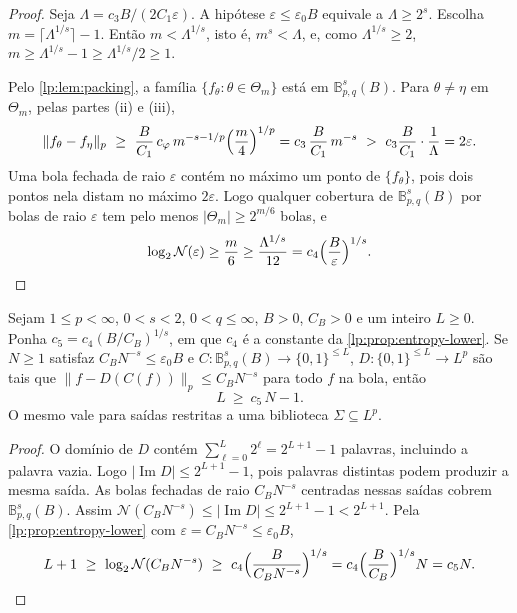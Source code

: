 \documentclass[12pt,a4paper]{article}
\begin{document}
\begin{proof}
Seja $\Lambda=c_3B/(2C_1\varepsilon)$. A hipótese $\varepsilon\le\varepsilon_0B$ equivale a $\Lambda\ge2^s$. Escolha $m=\lceil\Lambda^{1/s}\rceil-1$. Então $m<\Lambda^{1/s}$, isto é, $m^s<\Lambda$, e, como $\Lambda^{1/s}\ge2$, $m\ge\Lambda^{1/s}-1\ge\Lambda^{1/s}/2\ge1$.

Pelo \cref{lp:lem:packing}, a família $\{f_\theta:\theta\in\Theta_m\}$ está em $\mathbb B^s_{p,q}(B)$. Para $\theta\ne\eta$ em $\Theta_m$, pelas partes (ii) e (iii),
\[
\|f_\theta-f_\eta\|_p\ \ge\ \frac B{C_1}\,c_\varphi\,m^{-s-1/p}\Bigl(\frac m4\Bigr)^{1/p}=c_3\,\frac B{C_1}\,m^{-s}\ >\ c_3\frac B{C_1}\cdot\frac1\Lambda=2\varepsilon.
\]
Uma bola fechada de raio $\varepsilon$ contém no máximo um ponto de $\{f_\theta\}$, pois dois pontos nela distam no máximo $2\varepsilon$. Logo qualquer cobertura de $\mathbb B^s_{p,q}(B)$ por bolas de raio $\varepsilon$ tem pelo menos $|\Theta_m|\ge2^{m/6}$ bolas, e
\[
\log_2\mathcal N(\varepsilon)\ge\frac m6\ge\frac{\Lambda^{1/s}}{12}=c_4\Bigl(\frac B\varepsilon\Bigr)^{1/s}.\qedhere
\]
\end{proof}

\begin{corolario}
\label{lp:cor:bits-lower}
Sejam $1\le p<\infty$, $0<s<2$, $0<q\le\infty$, $B>0$, $C_B>0$ e um inteiro $L\ge0$. Ponha $c_5=c_4(B/C_B)^{1/s}$, em que $c_4$ é a constante da \cref{lp:prop:entropy-lower}. Se $N\ge1$ satisfaz $C_BN^{-s}\le\varepsilon_0B$ e $C:\mathbb B^s_{p,q}(B)\to\{0,1\}^{\le L}$, $D:\{0,1\}^{\le L}\to L^p$ são tais que $\|f-D(C(f))\|_p\le C_BN^{-s}$ para todo $f$ na bola, então
\[
L\ \ge\ c_5\,N-1.
\]
O mesmo vale para saídas restritas a uma biblioteca $\Sigma\subseteq L^p$.
\end{corolario}

\begin{proof}
O domínio de $D$ contém $\sum_{\ell=0}^L2^\ell=2^{L+1}-1$ palavras, incluindo a palavra vazia. Logo $|\operatorname{Im}D|\le2^{L+1}-1$, pois palavras distintas podem produzir a mesma saída. As bolas fechadas de raio $C_BN^{-s}$ centradas nessas saídas cobrem $\mathbb B^s_{p,q}(B)$. Assim $\mathcal N(C_BN^{-s})\le|\operatorname{Im}D|\le2^{L+1}-1<2^{L+1}$. Pela \cref{lp:prop:entropy-lower} com $\varepsilon=C_BN^{-s}\le\varepsilon_0B$,
\[
L+1\ \ge\ \log_2\mathcal N(C_BN^{-s})\ \ge\ c_4\Bigl(\frac{B}{C_BN^{-s}}\Bigr)^{1/s}=c_4\Bigl(\frac B{C_B}\Bigr)^{1/s}N=c_5N.\qedhere
\]
\end{proof}
\end{document}
